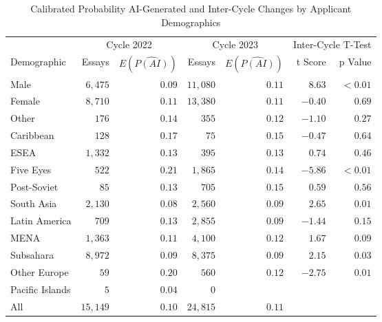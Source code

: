 \begin{table}[tbh]
    \centering
    \caption{Calibrated Probability AI-Generated and Inter-Cycle Changes by Applicant Demographics}
    \label{tab:demo_means}
    \begin{tabular}{ l r r r r r r}
        \toprule
        & \multicolumn{2}{c}{Cycle 2022} &  \multicolumn{2}{c}{Cycle 2023} & \multicolumn{2}{c}{Inter-Cycle T-Test} \\
        \cmidrule(lr){2-3} \cmidrule(lr){4-5} \cmidrule(lr){6-7}
        Demographic & Essays & $E(\widehat{P(AI)})$ & Essays & $E(\widehat{P(AI)})$ & t Score & p Value \\
        \midrule
        Male    & $6,475$ & $0.09$ & $11,080$ & $0.11$ & $8.63$ & $<0.01$ \\
        Female  & $8,710$ & $0.11$ & $13,380$ & $0.11$ & $-0.40$ & $0.69$ \\
        Other   & $176$   & $0.14$ & $355$    & $0.12$ & $-1.10$ & $0.27$ \\
        \midrule
        Caribbean               & $128$     & $0.17$ & $75$    & $0.15$ & $-0.47$ & $0.64$ \\
        ESEA     & $1,332$   & $0.13$ & $395$   & $0.13$ & $0.74$ & $0.46$ \\
        Five Eyes               & $522$     & $0.21$ & $1,865$ & $0.14$ & $-5.86$ & $<0.01$ \\
        Post-Soviet     & $85$      & $0.13$ & $705$   & $0.15$ & $0.59$ & $0.56$ \\
        South Asia     & $2,130$   & $0.08$ & $2,560$ & $0.09$ & $2.65$ & $0.01$ \\
        Latin America           & $709$     & $0.13$ & $2,855$ & $0.09$ & $-1.44$ & $0.15$ \\
        MENA   & $1,363$   & $0.11$ & $4,100$ & $0.12$ & $1.67$ & $0.09$ \\
        Subsahara      & $8,972$   & $0.09$ & $8,375$ & $0.09$ & $2.15$ & $0.03$ \\
        Other Europe            & $59$      & $0.20$ & $560$   & $0.12$ & $-2.75$ & $0.01$ \\
        Pacific Islands         & $5$       & $0.04$ & $0$      &  &  &  \\
        \midrule
        All         & $15,149$  & $0.10$ & $24,815$  & $0.11$ &  &  \\
        \bottomrule
    \end{tabular}
\end{table}

